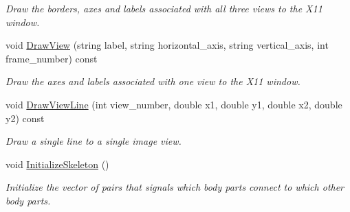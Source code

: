 \begin{DoxyCompactItemize}
\begin{DoxyCompactList}\small\item\em Draw the borders, axes and labels associated with all three views to the X11 window. \end{DoxyCompactList}\item 
\hypertarget{classPoseDisplay_af6c16081d868902bbbc34d8640d185e3}{}void \hyperlink{classPoseDisplay_af6c16081d868902bbbc34d8640d185e3}{Draw\+View} (string label, string horizontal\+\_\+axis, string vertical\+\_\+axis, int frame\+\_\+number) const \label{classPoseDisplay_af6c16081d868902bbbc34d8640d185e3}

\begin{DoxyCompactList}\small\item\em Draw the axes and labels associated with one view to the X11 window. \end{DoxyCompactList}\item 
\hypertarget{classPoseDisplay_a9708b913ab7a6258e5a67e6fe79a23a4}{}void \hyperlink{classPoseDisplay_a9708b913ab7a6258e5a67e6fe79a23a4}{Draw\+View\+Line} (int view\+\_\+number, double x1, double y1, double x2, double y2) const \label{classPoseDisplay_a9708b913ab7a6258e5a67e6fe79a23a4}

\begin{DoxyCompactList}\small\item\em Draw a single line to a single image view. \end{DoxyCompactList}\item 
\hypertarget{classPoseDisplay_a5c2541bf1dc46748a80fc4e8bac2736a}{}void \hyperlink{classPoseDisplay_a5c2541bf1dc46748a80fc4e8bac2736a}{Initialize\+Skeleton} ()\label{classPoseDisplay_a5c2541bf1dc46748a80fc4e8bac2736a}

\begin{DoxyCompactList}\small\item\em Initialize the vector of pairs that signals which body parts connect to which other body parts. \end{DoxyCompactList}\end{DoxyCompactItemize}
